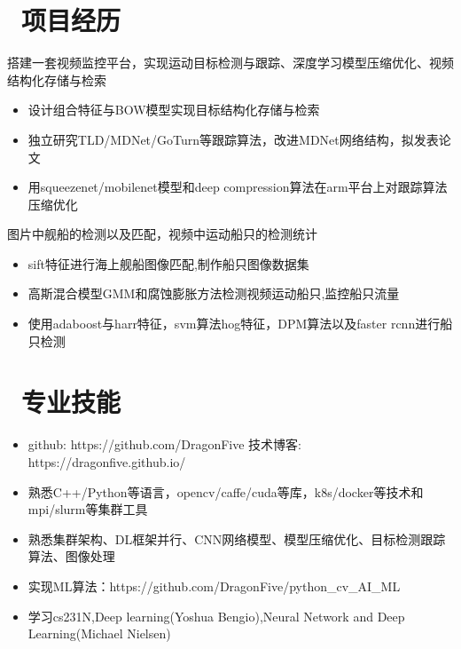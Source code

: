 \documentclass{resume}
\begin{document}
\section{\faCogs\ 项目经历}
搭建一套视频监控平台，实现运动目标检测与跟踪、深度学习模型压缩优化、视频结构化存储与检索
\begin{itemize}
  \item 设计组合特征与BOW模型实现目标结构化存储与检索
  \item 独立研究TLD/MDNet/GoTurn等跟踪算法，改进MDNet网络结构，拟发表论文
  \item 用squeezenet/mobilenet模型和deep compression算法在arm平台上对跟踪算法压缩优化
\end{itemize}


图片中舰船的检测以及匹配，视频中运动船只的检测统计
\begin{itemize}
  \item sift特征进行海上舰船图像匹配,制作船只图像数据集
  \item 高斯混合模型GMM和腐蚀膨胀方法检测视频运动船只,监控船只流量
  \item 使用adaboost与harr特征，svm算法hog特征，DPM算法以及faster rcnn进行船只检测
\end{itemize}




\section{\faInfo\ 专业技能}
\begin{itemize}[parsep=0.5ex]
  \item github: https://github.com/DragonFive 技术博客: https://dragonfive.github.io/
  \item 熟悉C++/Python等语言，opencv/caffe/cuda等库，k8s/docker等技术和mpi/slurm等集群工具
  \item 熟悉集群架构、DL框架并行、CNN网络模型、模型压缩优化、目标检测跟踪算法、图像处理
  \item 实现ML算法：https://github.com/DragonFive/python\_cv\_AI\_ML 
  \item 学习cs231N,Deep learning(Yoshua Bengio),Neural Network and Deep Learning(Michael Nielsen)
\end{itemize}

%
%
\end{document}
